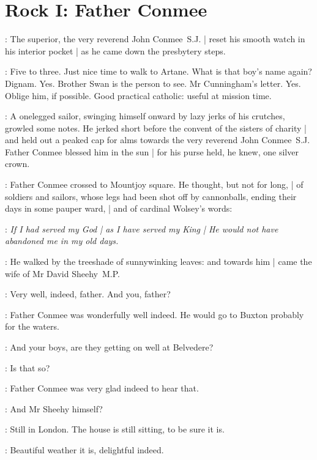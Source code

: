 \section*{Rock I: Father Conmee}

:
The superior, the very reverend John Conmee~S.J. |
reset his smooth watch in his interior pocket |
as he came down the presbytery steps.

\conmeeint:
Five to three.
Just nice time to walk to Artane.
What is that boy's name again?
Dignam.
Yes.
Brother Swan is the person to see.
Mr Cunningham's letter.
Yes.
Oblige him, if possible.
Good practical catholic:
useful at mission time.


:
A onelegged sailor,
swinging himself onward by lazy jerks of his crutches,
growled some notes.
He jerked short before the convent of the sisters of charity |
and held out a peaked cap for alms
towards the very reverend John Conmee~S.J.
Father Conmee blessed him in the sun |
for his purse held,
he knew,
one silver crown.


:
Father Conmee crossed to Mountjoy square.
He thought,
but not for long, |
of soldiers and sailors,
whose legs had been shot off by cannonballs,
ending their days in some pauper ward, |
and of cardinal Wolsey's words:

\conmeeint:
\emph{If I had served my God |
as I have served my King |
He would not have abandoned me in my old days.}

:
He walked by the treeshade of sunnywinking leaves:
and towards him |
came the wife of Mr David Sheehy~M.P.


\mrssheehy:
Very well, indeed, father.
And you, father?

:
Father Conmee was wonderfully well indeed.
He would go to Buxton probably for the waters.

\conmee:
And your boys, are they getting on well at Belvedere?

\conmee:
Is that so?

:
Father Conmee was very glad indeed to hear that.

\conmee:
And Mr Sheehy himself?

\mrssheehy:
Still in London.
The house is still sitting, to be sure it is.

\mrssheehy:
Beautiful weather it is, delightful indeed.

